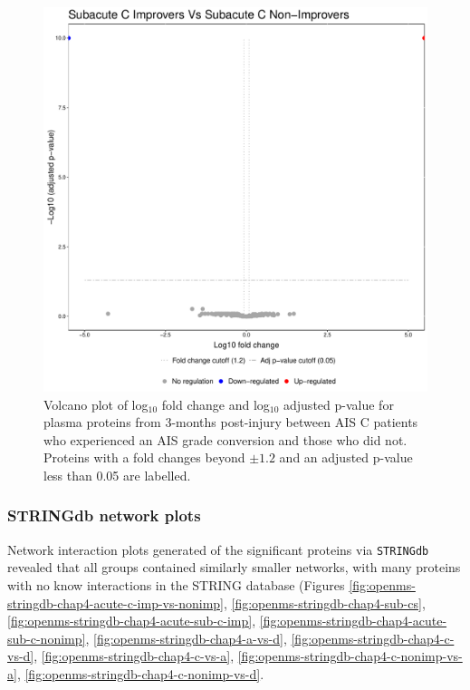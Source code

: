 \documentclass[9pt,lineno]{elife}
\begin{document}
\begin{figure}
\includegraphics[width=1\linewidth]{figures/openms_protein_quantification/label_free/openms_volcano_plot_2021-08-10_0026} \caption{Volcano plot of log\(_10\) fold change and log\(_10\) adjusted p-value for plasma proteins from 3-months post-injury between AIS C patients who experienced an AIS grade conversion and those who did not. Proteins with a fold changes beyond \(\pm 1.2\) and an adjusted p-value less than 0.05 are labelled.}\label{fig:volc-plot-subacute-c-imp-vs-nonimp}
\end{figure}

\hypertarget{stringdb-network-plots-1}{%
\subsubsection{STRINGdb network plots}\label{stringdb-network-plots-1}}

Network interaction plots generated of the significant proteins via \texttt{STRINGdb} revealed that all groups contained similarly smaller networks, with many proteins with no know interactions in the STRING database (Figures \ref{fig:openms-stringdb-chap4-acute-c-imp-vs-nonimp}, \ref{fig:openms-stringdb-chap4-sub-cs}, \ref{fig:openms-stringdb-chap4-acute-sub-c-imp}, \ref{fig:openms-stringdb-chap4-acute-sub-c-nonimp}, \ref{fig:openms-stringdb-chap4-a-vs-d}, \ref{fig:openms-stringdb-chap4-c-vs-d}, \ref{fig:openms-stringdb-chap4-c-vs-a}, \ref{fig:openms-stringdb-chap4-c-nonimp-vs-a}, \ref{fig:openms-stringdb-chap4-c-nonimp-vs-d}.
\end{document}
